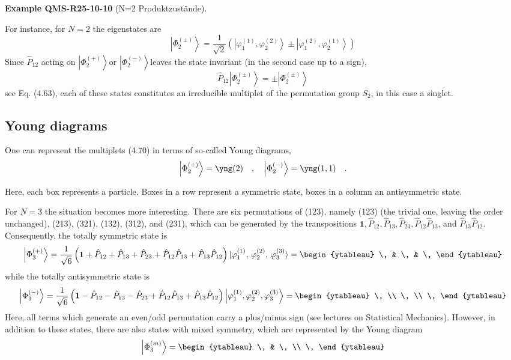 \documentclass[10pt, letterpaper]{article}
\newcommand{\CustomHeading}[3]{%
  \par\medskip\noindent%
  \textbf{#1 #2} \textnormal{(#3)}.\enskip%
}
\newenvironment{EXA}[2]{\begin{unitbox}\CustomHeading{Example}{#1}{#2}}{\end{unitbox}}
\begin{document}
\begin{EXA}{QMS-R25-10-10}{N=2 Produktzustände}
For instance, for $N=2$ the eigenstates are
$$
\left|\Phi_{2}^{( \pm)}\right\rangle=\frac{1}{\sqrt{2}}\left(\left|\varphi_{1}^{(1)}, \varphi_{2}^{(2)}\right\rangle \pm\left|\varphi_{1}^{(2)}, \varphi_{2}^{(1)}\right\rangle\right)
$$
Since $\hat{P}_{12}$ acting on $\left|\Phi_{2}^{(+)}\right\rangle$or $\left|\Phi_{2}^{(-)}\right\rangle$leaves the state invariant (in the second case up to a sign),
$$
\hat{P}_{12}\left|\Phi_{2}^{( \pm)}\right\rangle= \pm\left|\Phi_{2}^{( \pm)}\right\rangle
$$
see Eq. (4.63), each of these states constitutes an irreducible multiplet of the permutation group $S_{2}$, in this case a singlet.
\end{EXA}


\pagebreak


\subsection{Young diagrams}
One can represent the multiplets (4.70) in terms of so-called Young diagrams,
\[
\left|\Phi_2^{(+)}\right\rangle =
\yng(2)
\quad , \quad
\left|\Phi_2^{(-)}\right\rangle =
\yng(1,1)
\quad .
\]

Here, each box represents a particle. Boxes in a row represent a symmetric state, boxes in a column an antisymmetric state.

For $N=3$ the situation becomes more interesting. There are six permutations of (123), namely (123) (the trivial one, leaving the order unchanged), (213), (321), (132), (312), and (231), which can be generated by the transpositions $\mathbf{1}, \hat{P}_{12}, \hat{P}_{13}, \hat{P}_{23}, \hat{P}_{12} \hat{P}_{13}$, and $\hat{P}_{13} \hat{P}_{12}$. Consequently, the totally symmetric state is
\[
\left| \Phi^{(+)}_3 \right\rangle
= \frac{1}{\sqrt{6}} \left(
\mathbf{1} + \hat{P}_{12} + \hat{P}_{13} + \hat{P}_{23} + \hat{P}_{12} \hat{P}_{13} + \hat{P}_{13} \hat{P}_{12}
\right)
\ket{ \varphi^{(1)}_1,\, \varphi^{(2)}_2,\, \varphi^{(3)}_3 }
= \begin{ytableau}
\, & \, & \,
\end{ytableau}
\]
while the totally antisymmetric state is
\[
\left| \Phi^{(-)}_3 \right\rangle
= \frac{1}{\sqrt{6}} \left(
\mathbf{1}
- \hat{P}_{12}
- \hat{P}_{13}
- \hat{P}_{23}
+ \hat{P}_{12} \hat{P}_{13}
+ \hat{P}_{13} \hat{P}_{12}
\right)
\left| \varphi^{(1)}_1, \varphi^{(2)}_2, \varphi^{(3)}_3 \right\rangle
= 
\begin{ytableau}
\, \\
\, \\
\,
\end{ytableau}
\]
Here, all terms which generate an even/odd permutation carry a plus/minus sign (see lectures on Statistical Mechanics). However, in addition to these states, there are also states with mixed symmetry, which are represented by the Young diagram
\[
\left| \Phi^{(m)}_3 \right\rangle =
\begin{ytableau}
\, & \, \\
\,
\end{ytableau}
\]
\end{document}
